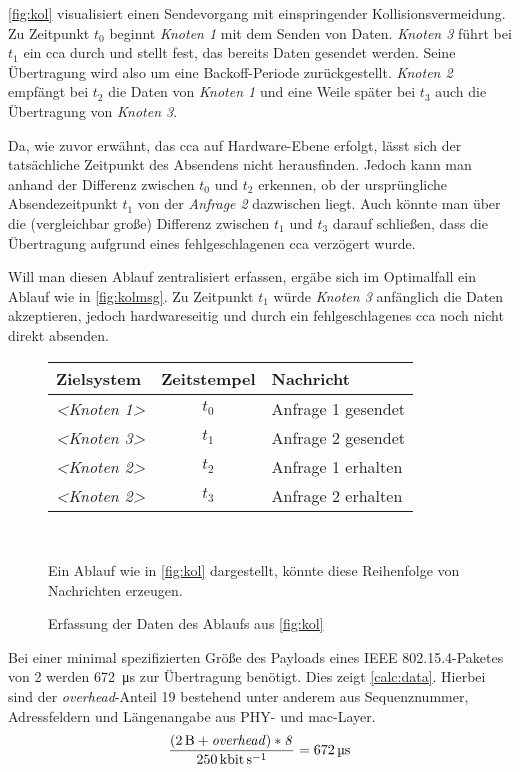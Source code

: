 \autoref{fig:kol} visualisiert einen Sendevorgang mit einspringender
Kollisionsvermeidung. Zu Zeitpunkt $t_0$ beginnt \emph{Knoten
1} mit dem Senden von Daten. \emph{Knoten 3} führt bei $t_1$ ein \gls{cca}
durch und stellt fest, das bereits Daten gesendet werden. Seine Übertragung
wird also um eine Backoff-Periode zurückgestellt. \emph{Knoten 2} empfängt bei
$t_2$ die Daten von \emph{Knoten 1} und eine Weile später bei $t_3$ auch die
Übertragung von \emph{Knoten 3}. 

Da, wie zuvor erwähnt, das \gls{cca} auf Hardware-Ebene erfolgt, lässt sich der
tatsächliche Zeitpunkt des Absendens nicht herausfinden. Jedoch kann man anhand
der Differenz zwischen $t_0$ und $t_2$ erkennen, ob der ursprüngliche
Absendezeitpunkt $t_1$ von der \emph{Anfrage 2} dazwischen liegt. Auch könnte
man über die (vergleichbar große) Differenz zwischen $t_1$ und $t_3$ darauf
schließen, dass die Übertragung aufgrund eines fehlgeschlagenen \gls{cca}
verzögert wurde.

Will man diesen Ablauf zentralisiert erfassen, ergäbe sich im Optimalfall ein
Ablauf wie in \autoref{fig:kolmsg}. Zu Zeitpunkt $t_1$ würde \emph{Knoten 3}
anfänglich die Daten akzeptieren, jedoch hardwareseitig und durch ein
fehlgeschlagenes \gls{cca} noch nicht direkt absenden.

\begin{figure}[!ht]
\centering
\par\begin{tabu}{l c l}
Zielsystem & Zeitstempel & Nachricht\\
\hline
\emph{<Knoten 1>} & \emph{$t_0$} & Anfrage 1 gesendet\\ 
\emph{<Knoten 3>} & \emph{$t_1$} & Anfrage 2 gesendet\\
\emph{<Knoten 2>} & \emph{$t_2$} & Anfrage 1 erhalten\\
\emph{<Knoten 2>} & \emph{$t_3$} & Anfrage 2 erhalten\\
\hline
\end{tabu}\\
\caption{Erfassung der Daten des Ablaufs aus \autoref{fig:kol}}{Ein Ablauf
wie in \autoref{fig:kol} dargestellt, könnte diese Reihenfolge von
Nachrichten erzeugen.}
\label{fig:kolmsg}
\end{figure}

Bei einer minimal spezifizierten Größe des Payloads eines
IEEE 802.15.4-Paketes von \SI{2}{\byte}\cite{IEEE01} werden
\SI{672}{\micro\second} zur Übertragung benötigt. Dies zeigt
\autoref{calc:data}. Hierbei sind der \emph{overhead}-Anteil \SI{19}{\byte}
bestehend unter anderem aus Sequenznummer, Adressfeldern und Längenangabe aus
PHY- und \gls{mac}-Layer.
\begin{align}\label{calc:data}
\frac{(\SI{2}{\byte}+\mathit{overhead)*8}}{\SI{250}{\kilo\bit\per\second}}=\SI{672}{\micro\second}
\end{align}

